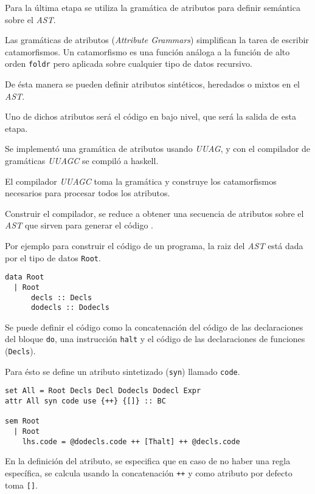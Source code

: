   Para la última etapa se utiliza la gramática de atributos para definir
semántica sobre el \emph{AST}.

Las gramáticas de atributos \cite{attributegrammar}(\emph{Attribute Grammars}) simplifican
la tarea de escribir catamorfismos.
Un catamorfismo es una función análoga a la función de alto orden
\texttt{foldr} pero aplicada sobre cualquier tipo de datos recursivo.

  De ésta manera se pueden definir atributos sintéticos,
  heredados o mixtos en el \emph{AST}.

  Uno de dichos atributos será el código en bajo nivel, que será la salida
de esta etapa.

  Se implementó una gramática de atributos usando \textit{UUAG}, y con
  el compilador de gramáticas \textit{UUAGC}\cite{uuagc} se
  compiló a haskell.

  El compilador \textit{UUAGC} toma la gramática y construye los
  catamorfismos necesarios para procesar todos los atributos.

  Construir el compilador, se reduce a obtener una secuencia de atributos
  sobre el \textit{AST} que sirven para generar el código \alf{}.

  Por ejemplo para construir el código de un programa, la raiz
  del \textit{AST} está dada por el tipo de datos \texttt{Root}.

\begin{Verbatim}
data Root
  | Root
      decls :: Decls
      dodecls :: Dodecls
\end{Verbatim}

  Se puede definir el código como la concatenación del código de
  las declaraciones del bloque \texttt{do}, una instrucción \texttt{halt}
  y el código de las declaraciones de funciones (\texttt{Decls}).

  Para ésto se define un atributo sintetizado (\texttt{syn})
  llamado \texttt{code}.

\begin{Verbatim}
set All = Root Decls Decl Dodecls Dodecl Expr
attr All syn code use {++} {[]} :: BC

sem Root
  | Root
    lhs.code = @dodecls.code ++ [Thalt] ++ @decls.code
\end{Verbatim}

  En la definición del atributo, se especifica que en caso de no haber
  una regla específica, se calcula usando la concatenación \texttt{++}
  y como atributo por defecto toma \texttt{[]}.

